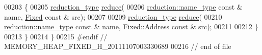 \begin{DoxyCode}
00203 \{
00205     \hyperlink{classhryky_1_1_intrusive_ptr}{reduction_type} \hyperlink{classhryky_1_1memory_1_1heap_1_1_fixed_ae7e05d5e6c2e2f83e1d593f4eab28bd7}{reduce}(
00206         \hyperlink{classhryky_1_1reduction_1_1_string}{reduction::name_type} \textcolor{keyword}{const} & name, \hyperlink{classhryky_1_1memory_1_1heap_1_1_fixed_ab063172ff9026356d34cac6dc39a207a}{Fixed} \textcolor{keyword}{const} & src);
00207 
00209     \hyperlink{classhryky_1_1_intrusive_ptr}{reduction_type} \hyperlink{classhryky_1_1memory_1_1heap_1_1_fixed_ae7e05d5e6c2e2f83e1d593f4eab28bd7}{reduce}(
00210         \hyperlink{classhryky_1_1reduction_1_1_string}{reduction::name_type} \textcolor{keyword}{const} & name, Fixed::Address \textcolor{keyword}{const} & src);
00211 
00212 \}
00213 \}
00214 \}
00215 \textcolor{preprocessor}{#endif // MEMORY\_HEAP\_FIXED\_H\_20111107003330689}
00216 \textcolor{preprocessor}{}\textcolor{comment}{// end of file}
\end{DoxyCode}
